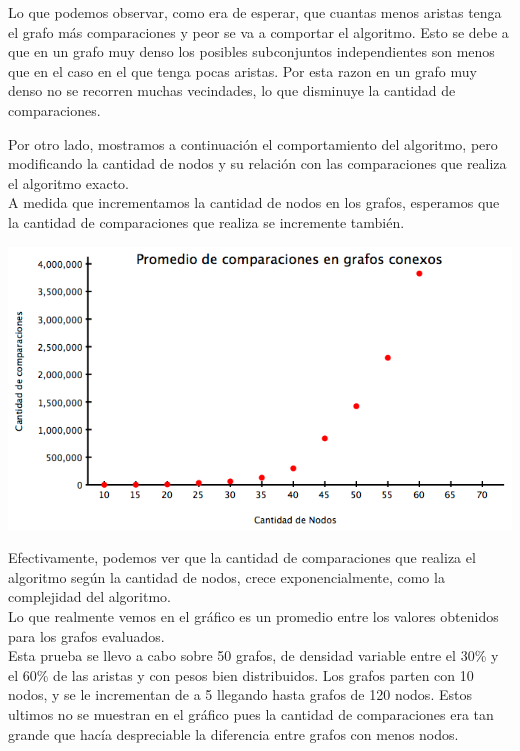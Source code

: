 \documentclass[a4paper, 10pt]{article}
\begin{document}
Lo que podemos observar, como era de esperar, que cuantas menos aristas tenga el grafo m\'as comparaciones y peor se va a comportar el algoritmo. Esto se debe a que en un grafo muy denso los posibles subconjuntos independientes son menos que en el caso en el que tenga pocas aristas. Por esta razon en un grafo muy denso no se recorren muchas vecindades, lo que disminuye la cantidad de comparaciones. \\

\newpage

Por otro lado, mostramos a continuaci\'on el comportamiento del algoritmo, pero modificando la cantidad de nodos y su relaci\'on con las comparaciones que realiza el algoritmo exacto. \\
A medida que incrementamos la cantidad de nodos en los grafos, esperamos que la cantidad de comparaciones que realiza se incremente tambi\'en.

\begin{center}
	\includegraphics[scale=0.50]{Graficos/03-03.png}
\end{center}

Efectivamente, podemos ver que la cantidad de comparaciones que realiza el algoritmo seg\'un la cantidad de nodos, crece exponencialmente, como la complejidad del algoritmo. \\

Lo que realmente vemos en el gr\'afico es un promedio entre los valores obtenidos para los grafos evaluados.\\ 
Esta prueba se llevo a cabo sobre 50 grafos, de densidad variable entre el 30\% y el 60\% de las aristas y con pesos bien distribuidos.
Los grafos parten con 10 nodos, y se le incrementan de a 5 llegando hasta grafos de 120 nodos.
Estos ultimos no se muestran en el gr\'afico pues la cantidad de comparaciones era tan grande que hac\'ia despreciable la diferencia entre grafos con menos nodos.\\ 
\end{document}
